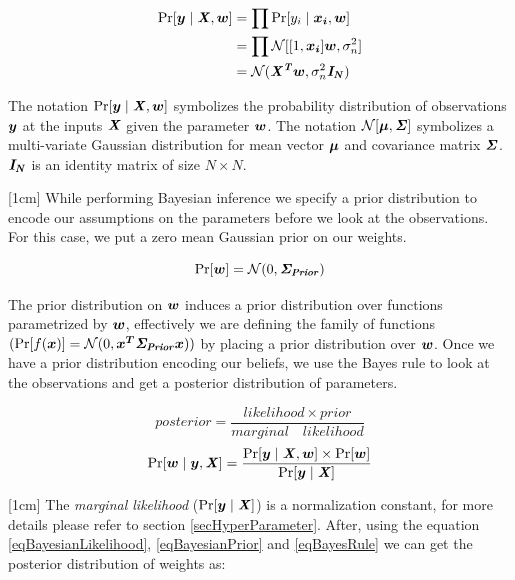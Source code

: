 \begin{equation}\label{eqBayesianLikelihood}
\begin{aligned}
\Pr[\boldsymbol{y} \mid \bm{\mathit{X}}, \boldsymbol{w}]  & = \prod \Pr[y_{i} \mid \boldsymbol{x_{i}}, \boldsymbol{w}]\\
                & = \prod \mathcal{N}[[1, \boldsymbol{x_{i}}]\boldsymbol{w} , \sigma_{n}^{2}]\\
                & = \mathcal{N}(\bm{\mathit{X^{T}}} \boldsymbol{w}, \sigma_{n}^{2}\bm{\mathit{I_N}})    
\end{aligned}
\end{equation}

The notation $\Pr[\boldsymbol{y} \mid \bm{\mathit{X}}, \boldsymbol{w}]$ symbolizes the probability distribution of observations $\boldsymbol{y}$ at the inputs $\bm{\mathit{X}}$ given the parameter $\boldsymbol{w}$. The notation $\mathcal{N}[\boldsymbol{\mu} , \bm{\mathit{\Sigma}}]$ symbolizes a multi-variate Gaussian distribution for mean vector $\boldsymbol{\mu}$ and covariance matrix $\bm{\mathit{\Sigma}}$. $\bm{\mathit{I_N}}$ is an identity matrix of size $N \times N$.

[1cm]
While performing Bayesian inference we specify a prior distribution to encode our assumptions on the parameters before we look at the observations. For this case, we put a zero mean Gaussian prior on our weights.

\begin{equation}\label{eqBayesianPrior}
\Pr[\boldsymbol{w}] = \mathcal{N}(0, \bm{\mathit{\Sigma_{Prior}}})
\end{equation}

The prior distribution on $\boldsymbol{w}$ induces a prior distribution over functions parametrized by $\boldsymbol{w}$, effectively we are defining the family of functions $(\Pr[f(\boldsymbol{x})] = \mathcal{N}(0, \boldsymbol{x^{T}}\bm{\mathit{\Sigma_{Prior}}}\boldsymbol{x}))$ by placing a prior distribution over $\boldsymbol{w}$. Once we have a prior distribution encoding our beliefs, we use the Bayes rule to look at the observations and get a posterior distribution of parameters.

\begin{equation*}
posterior = \frac{likelihood \times prior}{marginal \quad likelihood}
\end{equation*}
\begin{equation}\label{eqBayesRule}
\Pr[\boldsymbol{w} \mid \boldsymbol{y}, \bm{\mathit{X}}] = \frac{\Pr[\boldsymbol{y} \mid \bm{\mathit{X}}, \boldsymbol{w}] \times \Pr[\boldsymbol{w}]}{\Pr[\boldsymbol{y} \mid \bm{\mathit{X}}]}
\end{equation}

[1cm]
The \textsl{marginal likelihood} ($\Pr[\boldsymbol{y} \mid \bm{\mathit{X}}]$) is a normalization constant, for more details please refer to section \ref{secHyperParameter}. After, using the equation \ref{eqBayesianLikelihood}, \ref{eqBayesianPrior} and \ref{eqBayesRule} we can get the posterior distribution of weights as:

